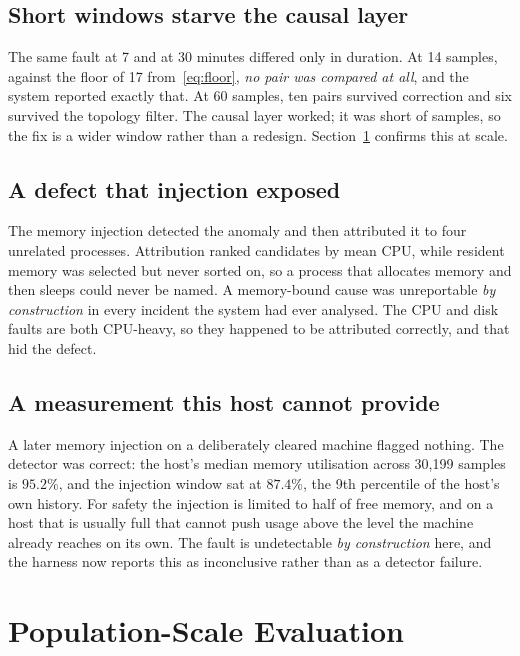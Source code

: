 \documentclass[conference,a4paper]{IEEEtran}
\begin{document}
\subsection{Short windows starve the causal layer}

The same fault at 7 and at 30 minutes differed only in duration. At 14 samples,
against the floor of 17 from~\eqref{eq:floor}, \emph{no pair was compared at
all}, and the system reported exactly that. At 60 samples, ten pairs survived
correction and six survived the topology filter. The causal layer worked;
it was short of samples, so the fix is a wider window rather than a redesign.
Section~\ref{sec:population} confirms this at scale.

\subsection{A defect that injection exposed}

The memory injection detected the anomaly and then attributed it to four
unrelated processes. Attribution ranked candidates by mean CPU, while resident
memory was selected but never sorted on, so a process that allocates memory
and then sleeps could never be named. A memory-bound cause was unreportable
\emph{by construction} in every incident the system had ever analysed. The CPU
and disk faults are both CPU-heavy, so they happened to be attributed
correctly, and that hid the defect.

\subsection{A measurement this host cannot provide}

A later memory injection on a deliberately cleared machine flagged nothing.
The detector was correct: the host's median memory utilisation across 30{,}199
samples is $95.2\%$, and the injection window sat at $87.4\%$, the 9th
percentile of the host's own history. For safety the injection is limited to
half of free memory, and on a host that is usually full that cannot push usage
above the level the machine already reaches on its own. The fault is undetectable \emph{by construction} here,
and the harness now reports this as inconclusive rather than as a detector
failure.

\section{Population-Scale Evaluation}
\label{sec:population}
\end{document}
